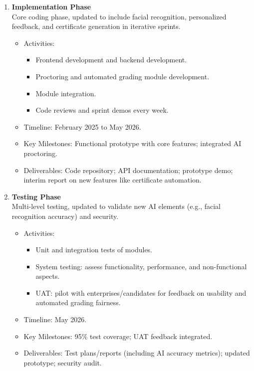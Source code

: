 \begin{enumerate}[leftmargin=*,label=\textbf{\arabic*.}]
    \item \textbf{Implementation Phase}\\
    Core coding phase, updated to include facial recognition, personalized feedback, and certificate generation in iterative sprints.
    \begin{itemize}[leftmargin=1.6em]
        \item Activities:
        \begin{itemize}[leftmargin=1.4em]
            \item Frontend development and backend development.
            \item Proctoring and automated grading module development.
            \item Module integration.
            \item Code reviews and sprint demos every week.
        \end{itemize}
        \item Timeline: February 2025 to May 2026.
        \item Key Milestones: Functional prototype with core features; integrated AI proctoring.
        \item Deliverables: Code repository; API documentation; prototype demo; interim report on new features like certificate automation.
    \end{itemize}

    \item \textbf{Testing Phase}\\
    Multi-level testing, updated to validate new AI elements (e.g., facial recognition accuracy) and security.
    \begin{itemize}[leftmargin=1.6em]
        \item Activities:
        \begin{itemize}[leftmargin=1.4em]
            \item Unit and integration tests of modules.
            \item System testing: assess functionality, performance, and non-functional aspects.
            \item UAT: pilot with enterprises/candidates for feedback on usability and automated grading fairness.
        \end{itemize}
        \item Timeline: May 2026.
        \item Key Milestones: 95\% test coverage; UAT feedback integrated.
        \item Deliverables: Test plans/reports (including AI accuracy metrics); updated prototype; security audit.
    \end{itemize}


\end{enumerate}
